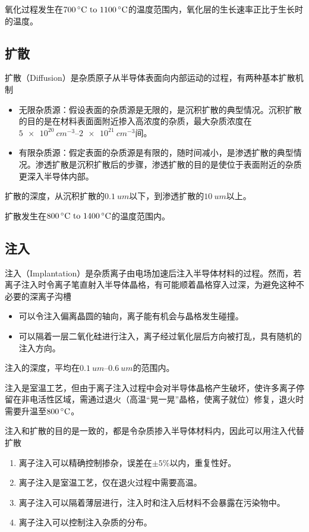氧化过程发生在$\SIrange{700}{1100}{\dc}$的温度范围内，氧化层的生长速率正比于生长时的温度。

\subsection{扩散}
扩散（Diffusion）是杂质原子从半导体表面向内部运动的过程，有两种基本扩散机制
\begin{itemize}
    \item 无限杂质源：假设表面的杂质源是无限的，是沉积扩散的典型情况。沉积扩散的目的是在材料表面面附近掺入高浓度的杂质，最大杂质浓度在$\SIrange{5e20}{2e21}{cm^{-3}}$间。
    \item 有限杂质源：假定表面的杂质源是有限的，随时间减小，是渗透扩散的典型情况。渗透扩散是沉积扩散后的步骤，渗透扩散的目的是使位于表面附近的杂质更深入半导体内部。
\end{itemize}

扩散的深度，从沉积扩散的$\SI{0.1}{um}$以下，到渗透扩散的$\SI{10}{um}$以上。

扩散发生在$\SIrange{800}{1400}{\dc}$的温度范围内。

\subsection{注入}
注入（Implantation）是杂质离子由电场加速后注入半导体材料的过程。然而，若离子注入时令离子笔直射入半导体晶格，有可能顺着晶格穿入过深，为避免这种不必要的深离子沟槽
\begin{itemize}
    \item 可以令注入偏离晶圆的轴向，离子能有机会与晶格发生碰撞。
    \item 可以隔着一层二氧化硅进行注入，离子经过氧化层后方向被打乱，具有随机的注入方向。
\end{itemize}

注入的深度，平均在$\SIrange{0.1}{0.6}{um}$的范围内。

注入是室温工艺，但由于离子注入过程中会对半导体晶格产生破坏，使许多离子停留在非电活性区域，需通过退火（高温“晃一晃”晶格，使离子就位）修复，退火时需要升温至$\SI{800}{\dc}$。

注入和扩散的目的是一致的，都是令杂质掺入半导体材料内，因此可以用注入代替扩散
\begin{enumerate}
    \item 离子注入可以精确控制掺杂，误差在$\pm 5\%$以内，重复性好。
    \item 离子注入是室温工艺，仅在退火过程中需要高温。
    \item 离子注入可以隔着薄层进行，注入时和注入后材料不会暴露在污染物中。
    \item 离子注入可以控制注入杂质的分布。
\end{enumerate}

